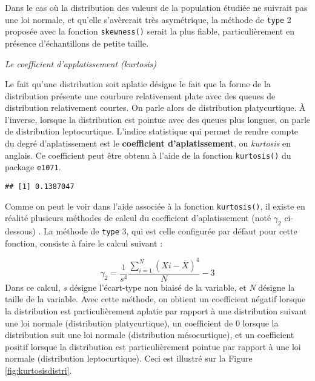 \documentclass[
  french,
]{book}
\newenvironment{Shaded}{\begin{snugshade}}{\end{snugshade}}
\newcommand{\DataTypeTok}[1]{\textcolor[rgb]{0.13,0.29,0.53}{#1}}
\newcommand{\DecValTok}[1]{\textcolor[rgb]{0.00,0.00,0.81}{#1}}
\newcommand{\KeywordTok}[1]{\textcolor[rgb]{0.13,0.29,0.53}{\textbf{#1}}}
\newcommand{\NormalTok}[1]{#1}
\newcommand{\OperatorTok}[1]{\textcolor[rgb]{0.81,0.36,0.00}{\textbf{#1}}}
\begin{document}
Dans le cas où la distribution des valeurs de la population étudiée ne suivrait pas une loi normale, et qu'elle s'avèrerait très asymétrique, la méthode de \texttt{type} 2 proposée avec la fonction \texttt{skewness()} serait la plus fiable, particulièrement en présence d'échantillons de petite taille.

\emph{Le coefficient d'applatissement (kurtosis)}

Le fait qu'une distribution soit aplatie désigne le fait que la forme de la distribution présente une courbure relativement plate avec des queues de distribution relativement courtes. On parle alors de distribution platycurtique. À l'inverse, lorsque la distribution est pointue avec des queues plus longues, on parle de distribution leptocurtique. L'indice statistique qui permet de rendre compte du degré d'aplatissement est le \textbf{coefficient d'aplatissement}, ou \emph{kurtosis} en anglais. Ce coefficient peut être obtenu à l'aide de la fonction \texttt{kurtosis()} du package \texttt{e1071}.

\begin{Shaded}
\end{Shaded}

\begin{verbatim}
## [1] 0.1387047
\end{verbatim}

Comme on peut le voir dans l'aide associée à la fonction \texttt{kurtosis()}, il existe en réalité plusieurs méthodes de calcul du coefficient d'aplatissement (noté \(\gamma_{2}\) ci-dessous) . La méthode de \texttt{type} 3, qui est celle configurée par défaut pour cette fonction, consiste à faire le calcul suivant :

\[\gamma_{2} =  \frac{1}{s^4} {\frac{\sum_{i=1}^{N} (X{i} - \overline{X})^4}{N}} -3\]
Dans ce calcul, \emph{s} désigne l'écart-type non biaisé de la variable, et \emph{N} désigne la taille de la variable. Avec cette méthode, on obtient un coefficient négatif lorsque la distribution est particulièrement aplatie par rapport à une distribution suivant une loi normale (distribution platycurtique), un coefficient de 0 lorsque la distribution suit une loi normale (distribution mésocurtique), et un coefficient positif lorsque la distribution est particulièrement pointue par rapport à une loi normale (distribution leptocurtique). Ceci est illustré sur la Figure \ref{fig:kurtosisdistri}.
\end{document}
